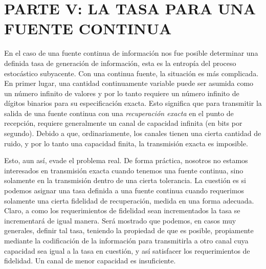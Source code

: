 \section{PARTE V: LA TASA PARA UNA FUENTE CONTINUA}
En el caso de una fuente continua de informaci\'on nos fue posible determinar 
una definida tasa de generaci\'on de informaci\'on, esta es la entrop\'ia del proceso
estoc\'astico subyacente. Con una continua fuente, la situaci\'on es m\'as complicada.
En primer lugar, una cantidad continuamente variable puede ser asumida como un
n\'umero infinito de valores y por lo tanto requiere un n\'umero infinito de
d\'igitos binarios para su especificaci\'on exacta. Esto significa que para
transmitir la salida de una fuente continua con una \textit{recuperaci\'on exacta} en
el punto de recepci\'on, requiere generalmente un canal de capacidad infinita
(en bits por segundo). Debido a que, ordinariamente, los canales tienen una
cierta cantidad de ruido, y por lo tanto una capacidad finita, la transmisi\'on
exacta es imposible.

Esto, aun as\'i, evade el problema real. De forma pr\'actica, nosotros no estamos 
interesados en transmisi\'on exacta cuando tenemos una fuente continua, sino 
solamente en la transmisi\'on dentro de una cierta tolerancia. La cuesti\'on es si
podemos asignar una tasa definida a una fuente continua cuando requerimos
solamente una cierta fidelidad de recuperaci\'on, medida en una forma adecuada.
Claro, a como los requerimientos de fidelidad sean incrementados la tasa
se incrementar\'a de igual manera. Ser\'a mostrado que podemos, en casos muy
generales, definir tal tasa, teniendo la propiedad de que es posible, 
propiamente mediante la codificaci\'on de la informaci\'on para transmitirla
a otro canal cuya capacidad sea igual a la tasa en cuesti\'on, y as\'i satisfacer
los requerimientos de fidelidad. Un canal de menor capacidad es insuficiente.

